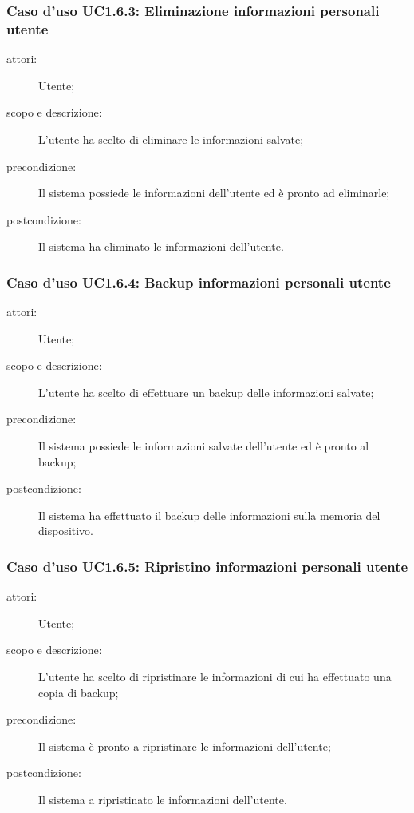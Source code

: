 \subsubsection{Caso d'uso UC1.6.3: Eliminazione informazioni personali utente}
\begin{description}
\item[attori:] Utente;
\item[scopo e descrizione:] L'utente ha scelto di eliminare le informazioni salvate;
\item[precondizione:] Il sistema possiede le informazioni dell'utente ed è pronto ad eliminarle;
\item[postcondizione:] Il sistema ha eliminato le informazioni dell'utente.
\end{description}

\subsubsection{Caso d'uso UC1.6.4: Backup informazioni personali utente}
\begin{description}
\item[attori:] Utente;
\item[scopo e descrizione:] L'utente ha scelto di effettuare un backup delle informazioni salvate;
\item[precondizione:] Il sistema possiede le informazioni salvate dell'utente ed è pronto al backup;
\item[postcondizione:] Il sistema ha effettuato il backup delle informazioni sulla memoria del dispositivo.
\end{description}

\subsubsection{Caso d'uso UC1.6.5: Ripristino informazioni personali utente}
\begin{description}
\item[attori:] Utente;
\item[scopo e descrizione:] L'utente ha scelto di ripristinare le informazioni di cui ha effettuato una copia di backup;
\item[precondizione:] Il sistema è pronto a ripristinare le informazioni dell'utente;
\item[postcondizione:] Il sistema a ripristinato le informazioni dell'utente.
\end{description}

